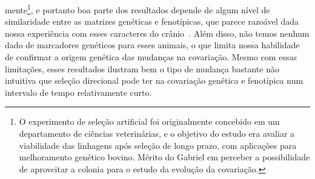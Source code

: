 \begin{refsection}
mente\footnote{O experimento de seleção artificial foi originalmente concebido
em um departamento de ciências veterinárias, e o objetivo do estudo era
avaliar a viabilidade das linhagens após seleção de longo prazo, com
aplicações para melhoramento genético bovino. Mérito do Gabriel em perceber a
possibilidade de aproveitar a colonia para o estudo da evolução da
covariação.}, e portanto boa parte dos resultados depende de algum nível de
similaridade entre as matrizes genéticas e fenotípicas, que parece razoável
dada nossa experiência com esses caracteres do
crânio~\parencite{Garcia2014-oj, Cheverud1988-he}. Além disso, não temos
nenhum dado de marcadores genéticos para esses animais, o que limita nossa
habilidade de confirmar a origem genética das mudanças na covariação. Mesmo
com essas limitações, esses resultados ilustram bem o tipo de mudança bastante
não intuitiva que seleção direcional pode ter na covariação genética e
fenotípica num intervalo de tempo relativamente curto.


\end{refsection}
